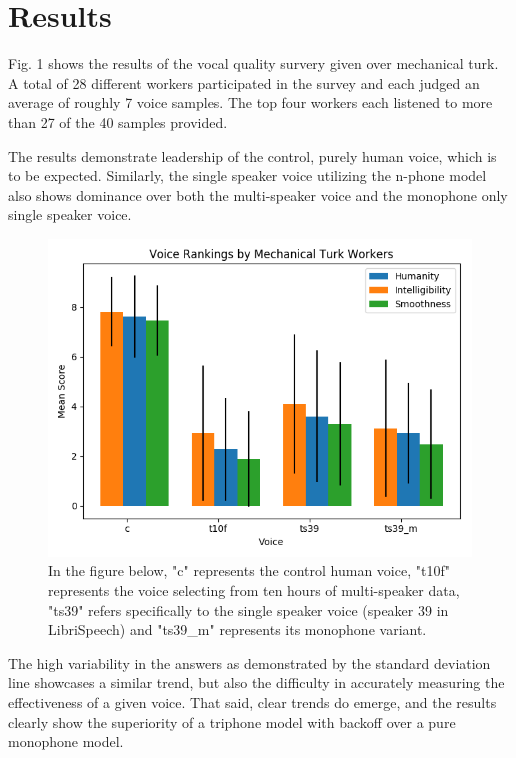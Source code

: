 \documentclass[10pt, journal, compsoc]{IEEEtran}
\begin{document}
\section{Results}
Fig. 1 shows the results of the vocal quality survery given over mechanical turk. A total of 28 different workers participated in the survey and each judged an average of roughly 7 voice samples. The top four workers each listened to more than 27 of the 40 samples provided. \par
The results demonstrate leadership of the control, purely human voice, which is to be expected. Similarly, the single speaker voice utilizing the n-phone model also shows dominance over both the multi-speaker voice and the monophone only single speaker voice.\par
\begin{figure}[h]
\caption{In the figure below, "c" represents the control human voice, "t10f" represents the voice selecting from ten hours of multi-speaker data, "ts39" refers specifically to the single speaker voice (speaker 39 in LibriSpeech) and "ts39\_m" represents its monophone variant.}
\centering
\includegraphics[scale=0.5]{../experiments/results/results_graph.png}
\end{figure}
The high variability in the answers as demonstrated by the standard deviation line showcases a similar trend, but also the difficulty in accurately measuring the effectiveness of a given voice. That said, clear trends do emerge, and the results clearly show the superiority of a triphone model with backoff over a pure monophone model. 
\end{document}
